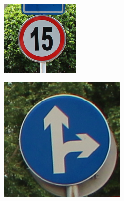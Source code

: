 \begin{figure}[H]
    \centering
    \begin{subfigure}[b]{0.125\textwidth}
        \centering
        \includegraphics[height=\textwidth]{../images/3 Konzeption des Generative Adversarial Networks/Chinese Dataset/001_0013.png}
        \caption{}
    \end{subfigure}
    \hspace{3em}%
    \begin{subfigure}[b]{0.125\textwidth}
        \centering
        \includegraphics[height=\textwidth]{../images/3 Konzeption des Generative Adversarial Networks/Chinese Dataset/020_0005.png}

\end{subfigure}
\end{figure}
